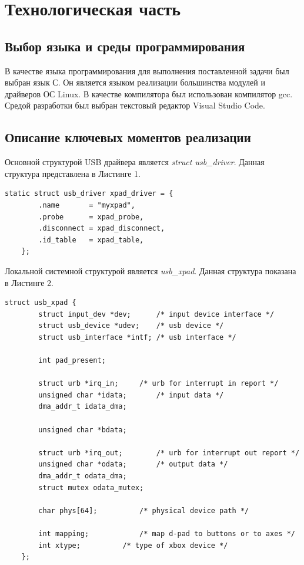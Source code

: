 \section{Технологическая часть}

\subsection{Выбор языка и среды программирования}
В качестве языка программирования для выполнения поставленной
задачи был выбран язык С. Он является языком реализации большинства
модулей и драйверов ОС Linux. В качестве компилятора был использован
компилятор gcc. Средой разработки был выбран текстовый редактор
Visual Studio Code.

\subsection{Описание ключевых моментов реализации}
Основной структурой USB драйвера является \textit{struct usb\_driver}. Данная структура представлена в Листинге 1.

\begin{lstlisting}[caption=Структура usb\_driver]
	static struct usb_driver xpad_driver = {
		.name		= "myxpad",
		.probe		= xpad_probe,
		.disconnect	= xpad_disconnect,
		.id_table	= xpad_table,
	};
\end{lstlisting}

Локальной системной структурой является \textit{usb\_xpad}. Данная структура показана в Листинге 2.

\begin{lstlisting}[caption=Структура usb\_xpad]
	struct usb_xpad {
		struct input_dev *dev;		/* input device interface */
		struct usb_device *udev;	/* usb device */
		struct usb_interface *intf;	/* usb interface */
		
		int pad_present;
		
		struct urb *irq_in;		/* urb for interrupt in report */
		unsigned char *idata;		/* input data */
		dma_addr_t idata_dma;
		
		unsigned char *bdata;
		
		struct urb *irq_out;		/* urb for interrupt out report */
		unsigned char *odata;		/* output data */
		dma_addr_t odata_dma;
		struct mutex odata_mutex;
		
		char phys[64];			/* physical device path */
		
		int mapping;			/* map d-pad to buttons or to axes */
		int xtype;			/* type of xbox device */
	};
\end{lstlisting}


